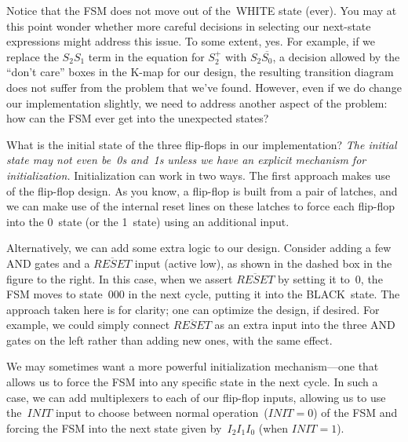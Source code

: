 Notice that the FSM does not move out of the~WHITE state (ever).  
%
You may at this point wonder whether more careful decisions 
in selecting our next-state expressions might address this issue.
To some extent, yes.  For example, if we replace the 
$S_2S_1$ term in the equation for $S_2^+$ with $S_2\overline{\mbox{$S_0$}}$, 
a decision allowed
by the ``don't care'' boxes in the K-map for our design,
the resulting transition diagram does not suffer from the problem
that we've found.
%
However, even if we do change our implementation slightly, we need
to address another aspect of the problem:
%
how can the FSM ever get into the unexpected states?

\begin{minipage}{2.25in}
What is the initial state of the three flip-flops in our implementation?
%
{\em The initial state may not even be~0s and~1s unless we have an 
explicit mechanism for initialization.} 
%
Initialization can work in two ways.  
%
The first approach makes use of the flip-flop design.
As you know, a flip-flop is built from a pair of latches, and
we can 
make use of the internal reset lines on these latches
to force each flip-flop into the 0~state (or the 1~state) using an
additional input. \mpline

Alternatively, we can add some extra logic to our design.
%
Consider adding a few AND gates and a $\overline{RESET}$ input
(active low), as shown in the dashed box in the figure to the right.
In this case, when we assert $\overline{RESET}$ by setting it to~0,
the FSM moves to state~000 in the next cycle, putting it into
the BLACK~state.  The approach taken here is for clarity; one can
optimize the design, if desired.  For example, we could simply connect
$\overline{RESET}$ as an extra input into the three AND gates on the
left rather than adding new ones, with the same effect.\mpline

We may sometimes want a more powerful initialization mechanism---one
that allows us to force the FSM into any specific state in the next
cycle.  In such a case, we can add multiplexers to each of our 
flip-flop inputs, allowing us to use the~$INIT$ input to choose between
normal operation~($INIT=0$) of the FSM and forcing the FSM into the
next state given by~$I_2I_1I_0$ (when $INIT=1$).
\end{minipage}\hspace{0.25in}%
\begin{minipage}{4in}
\vspace{12pt}
\centerline{}
\end{minipage}\vspace{8pt}




